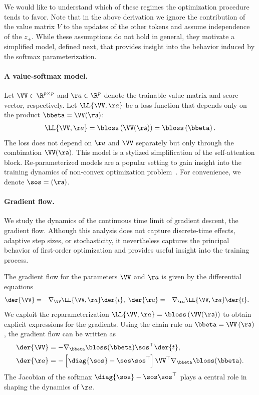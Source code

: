 \documentclass{article}
\theoremstyle{plain}
\theoremstyle{definition}
\theoremstyle{remark}
\begin{document}
We would like to understand which of these regimes the optimization procedure tends to favor. Note that in the above derivation we ignore the contribution of the value matrix $V$ to the updates of the other tokens and assume independence of the $z_{+}$. 
While these assumptions do not hold in general, they motivate a simplified model, defined next, that provides insight into the behavior induced by the softmax parameterization.

\paragraph{A value-softmax model.}
%
Let $\VV \in \R^{p \times p}$ and $\aa \in \R^{p}$ denote the trainable value matrix and score vector, respectively.  Let $\LL{\VV, \aa}$ be a loss function that depends only on the product  $\bbeta = \VV \sf(\aa)$:
\begin{align}
  \LL{\VV, \aa} = \bloss\left( \VV \sf(\aa) \right) = \bloss\left( \bbeta \right).
\end{align} 
The loss does not depend on $\aa$ and $\VV$ separately but only through the combination $\VV \sf(\aa)$. This model is a stylized simplification of the self-attention block.
%
Re-parameterized models are a popular setting to gain insight into the training dynamics of non-convex optimization problem~\citep{lireparam2022}.
%
For convenience, we denote $\sos = \sf(\aa)$.  

\paragraph{Gradient flow.}
%
We study the dynamics of the continuous time limit of gradient descent, the gradient flow. Although this analysis does not capture discrete-time effects, adaptive step sizes, or stochasticity, it nevertheless captures the principal behavior of first-order optimization and provides useful insight into the training process. 

The gradient flow for the parameters $\VV$ and $\aa$ is given by the differential equations 
\begin{align} \label{eq:gf-L}
  \der{\VV} &= - \nabla_{\VV} \LL{\VV, \aa} \der{t},  \,\,
  \der{\aa} = - \nabla_{\aa} \LL{\VV, \aa} \der{t}.
\end{align}
We exploit the  reparameterization $\LL{\VV,\aa} = \bloss\left( \VV \sf(\aa)\right)$ to obtain explicit expressions for the gradients. Using the chain rule on $\bbeta = \VV \sf\left( \aa \right)$, the gradient flow can be written as 
\begin{align}
  \der{\VV}  &= - \nabla_{\bbeta} \bloss(\bbeta) \sos^{\top} \der{t}, \\
  \der{\aa}  &= - \left[ \diag{\sos} - \sos \sos^{\top} \right] \VV^{\top} \nabla_{\bbeta} \bloss(\bbeta).
\end{align}
The Jacobian of the softmax $\diag{\sos} - \sos \sos^{\top}$ plays a central role in shaping the dynamics of  $\aa$.
\end{document}
